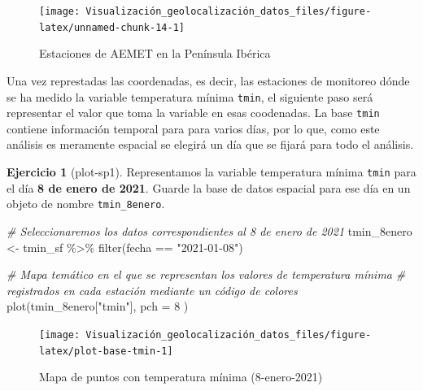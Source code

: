\documentclass[
]{report}
\newenvironment{Shaded}{\begin{snugshade}}{\end{snugshade}}
\newcommand{\AttributeTok}[1]{\textcolor[rgb]{0.77,0.63,0.00}{#1}}
\newcommand{\CommentTok}[1]{\textcolor[rgb]{0.56,0.35,0.01}{\textit{#1}}}
\newcommand{\DecValTok}[1]{\textcolor[rgb]{0.00,0.00,0.81}{#1}}
\newcommand{\FunctionTok}[1]{\textcolor[rgb]{0.00,0.00,0.00}{#1}}
\newcommand{\NormalTok}[1]{#1}
\newcommand{\OtherTok}[1]{\textcolor[rgb]{0.56,0.35,0.01}{#1}}
\newcommand{\SpecialCharTok}[1]{\textcolor[rgb]{0.00,0.00,0.00}{#1}}
\newcommand{\StringTok}[1]{\textcolor[rgb]{0.31,0.60,0.02}{#1}}
\theoremstyle{definition}
\theoremstyle{definition}
\theoremstyle{definition}
\newtheorem{exercise}{Ejercicio}[chapter]
\theoremstyle{definition}
\theoremstyle{remark}
\begin{document}
\begin{figure}

{\centering \texttt{[image: Visualización\_geolocalización\_datos\_files/figure-latex/unnamed-chunk-14-1]} 

}

\caption{Estaciones de AEMET en la Península Ibérica}\label{fig:unnamed-chunk-14}
\end{figure}

Una vez represtadas las coordenadas, es decir, las estaciones de monitoreo dónde
se ha medido la variable temperatura mínima \texttt{tmin}, el siguiente paso será
representar el valor que toma la variable en esas coodenadas. La base \texttt{tmin}
contiene información temporal para para varios días, por lo que, como este
análisis es meramente espacial se elegirá un día que se fijará para todo el
análisis.

\begin{exercise}[plot-sp1]
\protect\hypertarget{exr:ex10}{}\label{exr:ex10}Representamos la variable temperatura mínima \texttt{tmin} para el día \textbf{8 de enero de
2021}. Guarde la base de datos espacial para ese día en un objeto de nombre
\texttt{tmin\_8enero}.
\end{exercise}

\begin{Shaded}
\begin{Highlighting}[]

\CommentTok{\# Seleccionaremos los datos correspondientes al 8 de enero de 2021}
\NormalTok{tmin\_8enero }\OtherTok{\textless{}{-}}\NormalTok{ tmin\_sf }\SpecialCharTok{\%\textgreater{}\%}
  \FunctionTok{filter}\NormalTok{(fecha }\SpecialCharTok{==} \StringTok{"2021{-}01{-}08"}\NormalTok{)}


\CommentTok{\# Mapa temático en el que se representan los valores de temperatura mínima}
\CommentTok{\# registrados en cada estación mediante un código de colores}
\FunctionTok{plot}\NormalTok{(tmin\_8enero[}\StringTok{"tmin"}\NormalTok{],}
  \AttributeTok{pch =} \DecValTok{8}
\NormalTok{)}
\end{Highlighting}
\end{Shaded}

\begin{figure}

{\centering \texttt{[image: Visualización\_geolocalización\_datos\_files/figure-latex/plot-base-tmin-1]} 

}

\caption{Mapa de puntos con temperatura mínima (8-enero-2021)}\label{fig:plot-base-tmin}
\end{figure}
\end{document}
